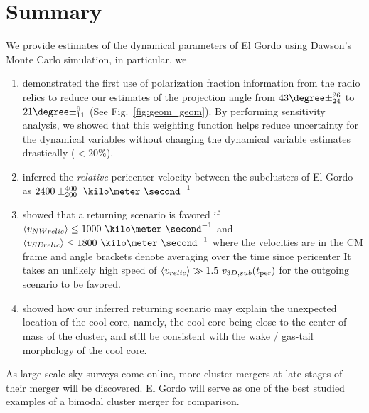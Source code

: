 \documentclass[ucdthesis.tex]{subfiles}
\begin{document}
    \section{Summary} 
    We provide estimates of the dynamical parameters of El Gordo using Dawson's
    Monte Carlo simulation, in particular, we 
    \begin{enumerate}
    	\item demonstrated the first use of polarization fraction information from
    		the radio relics to reduce our estimates of the projection angle from
    		$43\degree \pm ^{26}_{24}$ to $21 \degree \pm^{9}_{11}$ (See
    		Fig.~\ref{fig:geom_geom}). By performing sensitivity analysis, we
    		showed that this weighting function helps reduce uncertainty for the dynamical
    		variables without changing the dynamical variable estimates drastically ($< 20\%$).\\ 
    	\item inferred the {\it relative} pericenter velocity 
    		between the subclusters of El Gordo as 
    		$2400\pm^{400}_{200}~\kilo\meter~\second^{-1}$ \\ 
    	\item showed that a returning scenario is favored if $\langle v_{NW relic}\rangle \leq
    		1000~\kilo
    		\meter~\second^{-1}$ and $\langle v_{SE relic}\rangle \leq
    		1800~\kilo\meter~\second^{-1}$
    where the velocities are in the CM frame and angle brackets denote averaging over the time since pericenter
    		It takes
    		an unlikely high speed of $\langle v_{relic} \rangle \gg 1.5~v_{3D,
    		sub}(t_{\rm per})$ for the outgoing scenario to be favored. \\ 
    	\item showed how our inferred
    		returning scenario may explain the unexpected location of the cool
    		core, namely, the cool core being close to the center of mass of the
    		cluster, and still be consistent with the wake / gas-tail morphology of the cool core. 
    \end{enumerate}
    As large scale sky surveys come online, more cluster mergers at late
    stages of their merger will be discovered. El Gordo will serve as one of
    the best studied examples of a bimodal cluster merger for comparison.  
    
    
		
		\singlespacing
		{}
		\newpage
		
\end{document}
